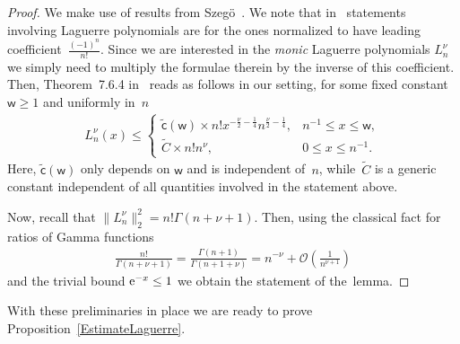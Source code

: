 \documentclass[pdftex]{sigma}
\numberwithin{equation}{section}
\begin{document}
\begin{proof}We make use of results from Szeg\"{o}~\cite{Szego}. We note that in~\cite{Szego} statements involving Laguerre polynomials are for the ones normalized to have leading coefficient~$\frac{(-1)^n}{n!}$. Since we are interested in the \textit{monic} Laguerre polynomials $L_n^{\nu}$ we simply need to multiply the formulae therein by the inverse of this coefficient. Then, Theorem~7.6.4 in~\cite{Szego} reads as follows in our setting, for some fixed constant $\mathsf{w}\ge 1$ and uniformly in~$n$
\begin{gather*}
L_n^{\nu}(x)\le \begin{cases}
\tilde{\mathsf{c}}(\mathsf{w})\times n! x^{-\frac{\nu}{2}-\frac{1}{4}}n^{\frac{\nu}{2}-\frac{1}{4}}, & n^{-1}\le x \le \mathsf{w},\\
\tilde{C} \times n! n^{\nu}, & 0 \le x \le n^{-1}.
\end{cases}
\end{gather*}
Here, $\tilde{\mathsf{c}}(\mathsf{w})$ only depends on $\mathsf{w}$ and is independent of~$n$, while~$\tilde{C}$ is a generic constant independent of all quantities involved in the statement above.

Now, recall that $\|L_n^{\nu}\|_2^2=n! \Gamma(n+\nu+1)$. Then, using the classical fact for ratios of Gamma functions
\begin{gather*}
\frac{n!}{\Gamma(n+\nu+1)}=\frac{\Gamma(n+1)}{\Gamma(n+1+\nu)}= n^{-\nu}+\mathcal{O}\left(\frac{1}{n^{\nu+1}}\right)
\end{gather*}
and the trivial bound ${\rm e}^{-x}\le 1$ we obtain the statement of the~lemma.
\end{proof}

With these preliminaries in place we are ready to prove Proposition~\ref{EstimateLaguerre}.
\end{document}
